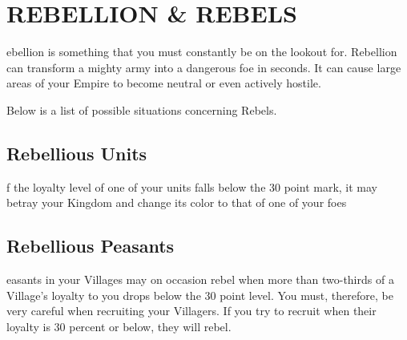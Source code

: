 
\chapter[Rebellion \& Rebels]{{\Huge R}EBELLION {\Huge \&} {\Huge R}EBELS}

ebellion is something that you must constantly be on the lookout for. Rebellion can transform a mighty army into a dangerous foe in seconds. It can cause large areas of your Empire to become neutral or even actively hostile.

Below is a list of possible situations concerning Rebels.

\section{Rebellious Units}


f the loyalty level of one of your units falls below the 30 point mark, it may betray your Kingdom and change its color to that of one of your foes

\section{Rebellious Peasants}


easants in your Villages may on occasion rebel when more than two-thirds of a Village’s loyalty to you drops below the 30 point level. You must, therefore, be very careful when recruiting your Villagers. If you try to recruit when their loyalty is 30 percent or below, they will rebel.

